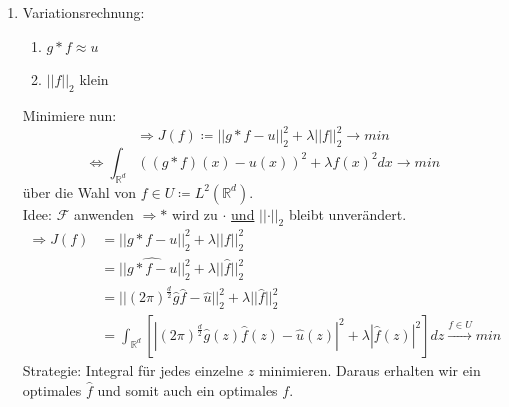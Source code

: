 \documentclass{article}
\theoremstyle{plain}
\theoremstyle{definition}
\numberwithin{equation}{section}
\newcommand{\norm}[1] {
\left|\left| #1 \right|\right|
}
\newcommand{\R}[0] {
\mathbb R
}
\newcommand{\F}[0]{
    \mathcal F
}
\newcommand{\C}[0]{
    \cdot
}
\begin{document}
\begin{enumerate}[label = \arabic*. Ansatz:]
\begin{minipage}[c]{0.4\textwidth}
\begin{center}
                        \end{center}
                    \end{minipage}
                    \item Variationsrechnung:
                        \begin{enumerate}[label = \arabic*. Wunsch:]
                            \item $g *f \approx u$
                            \item $\norm{f}_2$ klein
                        \end{enumerate}
                        Minimiere nun:
                        \[\Rightarrow J(f)  \coloneqq  \norm{g * f - u}_2^2 + \lambda \norm{f}_2^2 \to min\]
                        \[\iff \int_{\R^d} ((g*f)(x) - u(x))^2 + \lambda f(x)^2 dx \to min\]
                        über die Wahl von $f \in U \coloneqq  L^2(\R^d)$.\\
                        Idee: $\F$ anwenden $\Rightarrow *$ wird zu $\C$ \underline{und} $\norm{\C}_2$ bleibt unverändert.
                        \begin{align*}
                            \Rightarrow J(f)&=\norm{g*f-u}_2^2 + \lambda\norm{f}_2^2\\
                            &=||\widehat{g*f-u}||_2^2 + \lambda ||\hat f||_2^2\\
                            &=||(2 \pi)^\frac{d}{2} \hat g \hat f -\hat u||_2^2 + \lambda||\hat f||_2^2\\
                            &=\int_{\R^d}\left[ \left|(2 \pi)^\frac{d}{2} \hat g(z) \hat f(z) - \hat u(z)\right|^2 + \lambda |\hat f(z)|^2 \right] dz \overset{f \in U}{\longrightarrow} min
                        \end{align*}
                    Strategie: Integral für jedes einzelne $z$ minimieren. Daraus erhalten wir ein optimales $\hat f$ und somit auch ein optimales $f$.\\

\end{enumerate}
\end{document}
